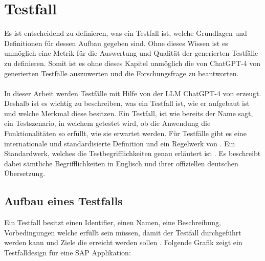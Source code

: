 \documentclass[12pt,toc=bib,toc=listof]{scrreprt}
\begin{document}
\section{Testfall} %
\label{sec:testfall}
Es ist entscheidend zu definieren, was ein Testfall ist, welche Grundlagen und Definitionen für dessen Aufbau gegeben sind. Ohne dieses Wissen ist es unmöglich eine Metrik für die Auswertung und Qualität der generierten Testfälle zu definieren. Somit ist es ohne dieses Kapitel unmöglich die von ChatGPT-4 von \textcite{OpenAI2025} generierten Testfälle auszuwerten und die Forschungsfrage zu beantworten.\\
\\
In dieser Arbeit werden Testfälle mit Hilfe von der LLM ChatGPT-4 von \textcite{OpenAI2025} erzeugt. Deshalb ist es wichtig zu beschreiben, was ein Testfall ist, wie er aufgebaut ist und welche Merkmal diese besitzen. Ein Testfall, ist wie bereits der Name sagt, ein Testszenario, in welchem getestet wird, ob die Anwendung die Funktionalitäten so erfüllt, wie sie erwartet werden. Für Testfälle gibt es eine internationale und standardisierte Definition und ein Regelwerk von \textcite{IsoIecIeee2024}. Ein Standardwerk, welches die Testbegrifflichkeiten genau erläutert ist \textcite{Istqb2017}. Es beschreibt dabei sämtliche Begrifflichkeiten in Englisch und ihrer offiziellen deutschen Übersetzung.

\subsection{Aufbau eines Testfalls} %
\label{sec:aufbauEinesTestfalls}
Ein Testfall besitzt einen Identifier, einen Namen, eine Beschreibung, Vorbedingungen welche erfüllt sein müssen, damit der Testfall durchgeführt werden kann und Ziele die erreicht werden sollen \textcite{IsoIecIeee2024}. Folgende Grafik zeigt ein Testfalldesign für eine SAP Applikation:
\end{document}
